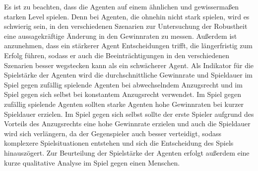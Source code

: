 Es ist zu beachten, dass die Agenten auf einem ähnlichen und gewissermaßen starken Level spielen. Denn bei Agenten, die ohnehin nicht stark spielen, wird es schwierig sein, in den verschiedenen Szenarien zur Untersuchung der Robustheit eine aussagekräftige Änderung in den Gewinnraten zu messen. Außerdem ist anzunehmen, dass ein stärkerer Agent Entscheidungen trifft, die längerfristig zum Erfolg führen, sodass er auch die Beeinträchtigungen in den verschiedenen Szenarien besser wegstecken kann als ein schwächerer Agent. Als Indikator für die Spielstärke der Agenten wird die durchschnittliche Gewinnrate und Spieldauer im Spiel gegen zufällig spielende Agenten bei abwechselndem Anzugsrecht und im Spiel gegen sich selbst bei konstantem Anzugsrecht verwendet. Im Spiel gegen zufällig spielende Agenten sollten starke Agenten hohe Gewinnraten bei kurzer Spieldauer erzielen. Im Spiel gegen sich selbst sollte der erste Spieler aufgrund des Vorteils des Anzugsrechts eine hohe Gewinnrate erzielen und auch die Spieldauer wird sich verlängern, da der Gegenspieler auch besser verteidigt, sodass komplexere Spielsituationen entstehen und sich die Entscheidung des Spiels hinauszögert. Zur Beurteilung der Spielstärke der Agenten erfolgt außerdem eine kurze qualitative Analyse im Spiel gegen einen Menschen.
